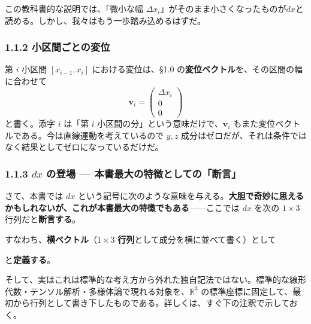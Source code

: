 \documentclass[a4paper,12pt,openany]{book}
\begin{document}
この教科書的な説明では、「微小な幅
\(\Delta x_i\)」がそのまま小さくなったものが\(dx\)と読める。しかし、我々はもう一歩踏み込めるはずだ。

\hypertarget{ux5c0fux533aux9593ux3054ux3068ux306eux5909ux4f4d}{%
\subsubsection{1.1.2
小区間ごとの変位}\label{ux5c0fux533aux9593ux3054ux3068ux306eux5909ux4f4d}}

第 \(i\) 小区間 \([x_{i-1}, x_i]\) における変位は、§1.0
の\textbf{変位ベクトル}を、その区間の幅に合わせて
\[\mathbf{v}_i = \begin{pmatrix} \Delta x_i \\ 0 \\ 0 \end{pmatrix}\]
と書く。添字 \(i\) は「第 \(i\)
小区間の分」という意味だけで、\(\mathbf{v}_i\)
もまた変位ベクトルである。今は直線運動を考えているので \(y,z\)
成分はゼロだが、それは条件ではなく結果としてゼロになっているだけだ。

\clearpage

\hypertarget{dx-ux306eux767bux5834-ux672cux66f8ux6700ux5927ux306eux7279ux5fb4ux3068ux3057ux3066ux306eux65adux8a00}{%
\subsubsection{\texorpdfstring{1.1.3 \(dx\) の登場 —
本書最大の特徴としての「断言」}{1.1.3 dx の登場 — 本書最大の特徴としての「断言」}}\label{dx-ux306eux767bux5834-ux672cux66f8ux6700ux5927ux306eux7279ux5fb4ux3068ux3057ux3066ux306eux65adux8a00}}

さて、本書では \(dx\)
という記号に次のような意味を与える。\textbf{大胆で奇妙に思えるかもしれないが、これが本書最大の特徴でもある}——ここでは
\(dx\) を次の \(1\times 3\) 行列だと\textbf{断言する}。

すなわち、\textbf{横ベクトル}（\(1\times 3\)
\textbf{行列}として成分を横に並べて書く）として

\begin{center}\end{center}

と\textbf{定義する}。

そして、実はこれは標準的な考え方から外れた独自記法ではない。標準的な線形代数・テンソル解析・多様体論で現れる対象を、\(\mathbb R^3\)
の標準座標に固定して、最初から行列として書き下したものである。詳しくは、すぐ下の注釈で示しておく。
\end{document}
